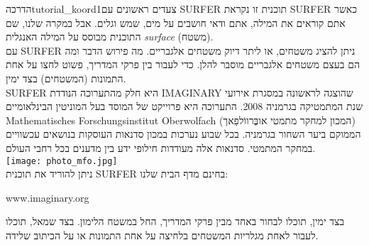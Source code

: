 \begin{surferIntroPage}{הדרכה}{tutorial_koord1}{צעדים ראשונים עם SURFER}
תוכנית זו נקראת SURFER כאשר אתם קוראים את המילה, אתם ודאי חושבים על מים, שמש וגלים. אבל במקרה שלנו, שם התוכנית מבוסס על המילה האנגלית {\it surface} (משטח).
\\
עם SURFER ניתן להציג משטחים, או ליתר דיוק משטחים אלגבריים. מה פירוש הדבר ומה הם בעצם משטחים אלגבריים מוסבר להלן. כדי לעבור בין פרקי המדריך, פשוט לחצו על אחת התמונות (המשטחים) בצד ימין.\\
SURFER היא חלק מהתערוכה הנודדת IMAGINARY שהוצגה לראשונה במסגרת אירועי שנת המתמטיקה בגרמניה 2008. התערוכה היא פרוייקט של המוסד בעל המוניטין הבינלאומיים Mathematisches Forschungsinstitut Oberwolfach (המכון למחקר מתמטי אובֶּרווֹלפַאך) הממוקם ביער השחור בגרמניה. בכל שבוע נערכות במכון סדנאות העוסקות בנושאים עכשוויים במחקר המתמטי. סדנאות אלה מעודדות חילופי ידע בין מדענים בכל רחבי העולם. \\
\vspace{0.2cm} \hspace{3.5cm}\texttt{[image: photo\_mfo.jpg]}\\
ניתן להוריד את תוכנית SURFER בחינם מדף הבית שלנו: \\
\begin{centering}
www.imaginary.org\\
\end{centering}
 \vspace{0,2cm}
בצד ימין, תוכלו לבחור באחד מבין פרקי המדריך, החל במשטח הלימון. בצד שמאל, תוכלו לעבור לאחת מגלריות המשטחים בלחיצה על אחת התמונות או על הכיתוב שלידה.
\end{surferIntroPage}
